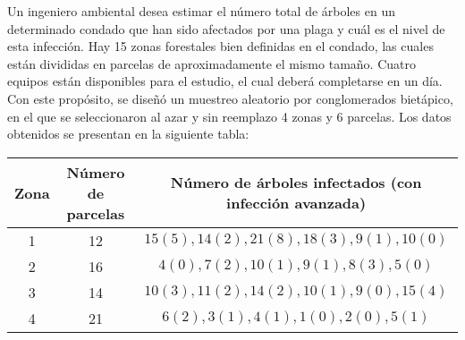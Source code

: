 \addpoints

\question[40] Un ingeniero ambiental desea estimar el número total de árboles en un determinado condado que han sido afectados por una plaga y cuál es el nivel de esta infección. Hay 15 zonas forestales bien definidas en el condado, las cuales están divididas en parcelas de aproximadamente el mismo tamaño. Cuatro equipos están disponibles para el estudio, el cual deberá completarse en un día. Con este propósito, se diseñó un muestreo aleatorio por conglomerados bietápico, en el que se seleccionaron al azar y sin reemplazo 4 zonas y 6 parcelas. Los datos obtenidos se presentan en la siguiente tabla:

\begin{center}
\begin{tabular}{ccc} 
Zona & Número de parcelas & Número de árboles infectados (con infección avanzada) \\
\hline 1 & 12 & $15(5), 14(2), 21(8), 18(3), 9(1), 10(0)$ \\
2 & 16 & $4(0), 7(2), 10(1), 9(1), 8(3), 5(0)$ \\
3 & 14 & $10(3), 11(2), 14(2), 10(1), 9(0), 15(4)$ \\
4 & 21 & $6(2), 3(1), 4(1), 1(0), 2(0), 5(1)$ \\
\hline
\end{tabular}
\end{center}


